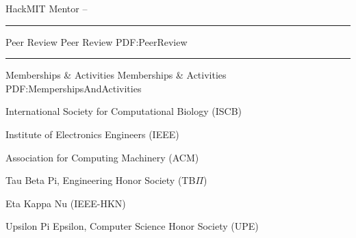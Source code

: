 \documentclass[letterpaper,MMMyyyy,nonstopmode]{simpleresumecv}
\begin{document}
\begin{Body}
\Entry
{HackMIT Mentor}
\hfill
{} -- 
\Gap



\BigGap
\hrule
\Section
{Peer Review}
{Peer Review}
{PDF:PeerReview}

\BigGap
\hrule
\Section
{Memberships\newline
\& Activities}
{Memberships \& Activities}
{PDF:MempershipsAndActivities}

\Entry
{International Society for Computational Biology (ISCB)}
\hfill
\Gap

\Entry
{Institute of Electronics Engineers (IEEE)}
\hfill
\Gap

\Entry
{Association for Computing Machinery (ACM)}
\hfill
\Gap

\Entry
{Tau Beta Pi, Engineering Honor Society (TB$\Pi$)}
\hfill
\Gap

\Entry
{Eta Kappa Nu (IEEE-HKN)}
\hfill
\Gap

\Entry
{Upsilon Pi Epsilon, Computer Science Honor Society (UPE)}
\hfill
\Gap





\end{Body}
\end{document}
